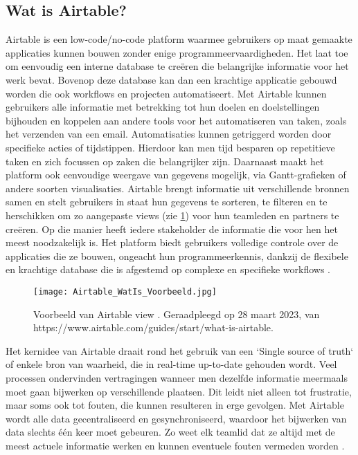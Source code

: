 \subsection{Wat is Airtable?}


Airtable is een low-code/no-code platform waarmee gebruikers op maat gemaakte applicaties kunnen bouwen zonder enige programmeervaardigheden. Het laat toe om eenvoudig een interne database te creëren die belangrijke informatie voor het werk bevat. Bovenop deze database kan dan een krachtige applicatie gebouwd worden die ook workflows en projecten automatiseert. Met Airtable kunnen gebruikers alle informatie met betrekking tot hun doelen en doelstellingen bijhouden en koppelen aan andere tools voor het automatiseren van taken, zoals het verzenden van een email. Automatisaties kunnen getriggerd worden door specifieke acties of tijdstippen. Hierdoor kan men tijd besparen op repetitieve taken en zich focussen op zaken die belangrijker zijn. Daarnaast maakt het platform ook eenvoudige weergave van gegevens mogelijk, via Gantt-grafieken of andere soorten visualisaties. Airtable brengt informatie uit verschillende bronnen samen en stelt gebruikers in staat hun gegevens te sorteren, te filteren en te herschikken om zo aangepaste views (zie \ref{fig:exampleairtable}) voor hun teamleden en partners te creëren. Op die manier heeft iedere stakeholder de informatie die voor hen het meest noodzakelijk is. Het platform biedt gebruikers volledige controle over de applicaties die ze bouwen, ongeacht hun programmeerkennis, dankzij de flexibele en krachtige database die is afgestemd op complexe en specifieke workflows \autocite{AirtableWhat}. \\

\begin{figure}
    \centering
    \texttt{[image: Airtable\_WatIs\_Voorbeeld.jpg]}
    \caption{Voorbeeld van Airtable view \autocite{AirtableWhat}. Geraadpleegd op 28 maart 2023, van https://www.airtable.com/guides/start/what-is-airtable.}
    \label{fig:exampleairtable}
\end{figure}

Het kernidee van Airtable draait rond het gebruik van een `Single source of truth` of enkele bron van waarheid, die in real-time up-to-date gehouden wordt. Veel processen ondervinden vertragingen 
wanneer men dezelfde informatie meermaals moet gaan bijwerken op verschillende plaatsen. Dit leidt niet alleen tot frustratie, maar soms ook tot fouten, die kunnen resulteren in erge gevolgen. Met Airtable wordt alle data gecentraliseerd en gesynchroniseerd, waardoor het bijwerken van data slechts één keer moet gebeuren. Zo weet elk teamlid dat ze altijd met de meest actuele informatie werken en kunnen eventuele fouten vermeden worden \autocite{AirtableWhat}. \\

